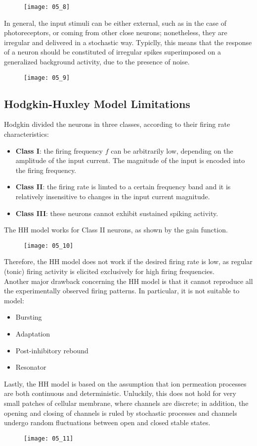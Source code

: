 \begin{figure}[H]
    \texttt{[image: 05\_8]}
    \centering
\end{figure}
In general, the input stimuli can be either external, such as in the case of photoreceptors,
or coming from other close neurons; nonetheless, they are irregular and delivered in a
stochastic way. Typiclly, this means that the response of a neuron should be constituted of
irregular spikes superimposed on a generalized background activity, due to the presence of
noise.
\begin{figure}[H]
    \texttt{[image: 05\_9]}
    \centering
\end{figure}

\subsection{Hodgkin-Huxley Model Limitations}
Hodgkin divided the neurons in three classes, according to their firing rate characteristics:
\begin{itemize}
    \item \textbf{Class I}: the firing frequency \(f\) can be arbitrarily low, depending on
          the amplitude of the input current. The magnitude of the input is encoded into the
          firing frequency.
    \item \textbf{Class II}: the firing rate is limted to a certain frequency band and it is
          relatively insensitive to changes in the input current magnitude.
    \item \textbf{Class III}: these neurons cannot exhibit sustained spiking activity.
\end{itemize}
The HH model works for Class II neurons, as shown by the gain function.
\begin{figure}[H]
    \texttt{[image: 05\_10]}
    \centering
\end{figure}
Therefore, the HH model does not work if the desired firing rate is low, as regular (tonic)
firing activity is elicited exclusively for high firing frequencies.\\
Another major drawback concerning the HH model is that it cannot reproduce all the
experimentally observed firing patterns. In particular, it is not suitable to model:
\begin{itemize}
    \item Bursting
    \item Adaptation
    \item Post-inhibitory rebound
    \item Resonator
\end{itemize}
Lastly, the HH model is based on the assumption that ion permeation processes are
both continuous and deterministic. Unluckily, this does not hold for very small patches of
cellular membrane, where channels are discrete; in addition, the opening and closing of
channels is ruled by stochastic processes and channels undergo random fluctuations between
open and closed stable states.
\begin{figure}[H]
    \texttt{[image: 05\_11]}
    \centering
\end{figure}